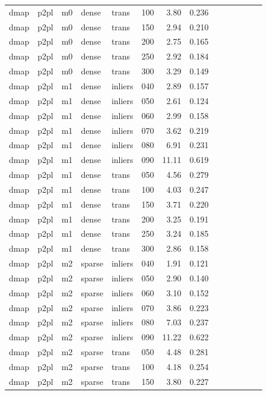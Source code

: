 \begin{table}[htbp]
\begin{tabular}{llllllrrrrrrrr}
  dmap & p2pl & m0 & dense & trans & 100 & 3.80 & 0.236 \\
  dmap & p2pl & m0 & dense & trans & 150 & 2.94 & 0.210 \\
  dmap & p2pl & m0 & dense & trans & 200 & 2.75 & 0.165 \\
  dmap & p2pl & m0 & dense & trans & 250 & 2.92 & 0.184 \\
  dmap & p2pl & m0 & dense & trans & 300 & 3.29 & 0.149 \\
  dmap & p2pl & m1 & dense & inliers & 040 & 2.89 & 0.157 \\
  dmap & p2pl & m1 & dense & inliers & 050 & 2.61 & 0.124 \\
  dmap & p2pl & m1 & dense & inliers & 060 & 2.99 & 0.158 \\
  dmap & p2pl & m1 & dense & inliers & 070 & 3.62 & 0.219 \\
  dmap & p2pl & m1 & dense & inliers & 080 & 6.91 & 0.231 \\
  dmap & p2pl & m1 & dense & inliers & 090 & 11.11 & 0.619 \\
  dmap & p2pl & m1 & dense & trans & 050 & 4.56 & 0.279 \\
  dmap & p2pl & m1 & dense & trans & 100 & 4.03 & 0.247 \\
  dmap & p2pl & m1 & dense & trans & 150 & 3.71 & 0.220 \\
  dmap & p2pl & m1 & dense & trans & 200 & 3.25 & 0.191 \\
  dmap & p2pl & m1 & dense & trans & 250 & 3.24 & 0.185 \\
  dmap & p2pl & m1 & dense & trans & 300 & 2.86 & 0.158 \\
  dmap & p2pl & m2 & sparse & inliers & 040 & 1.91 & 0.121 \\
  dmap & p2pl & m2 & sparse & inliers & 050 & 2.90 & 0.140 \\
  dmap & p2pl & m2 & sparse & inliers & 060 & 3.10 & 0.152 \\
  dmap & p2pl & m2 & sparse & inliers & 070 & 3.86 & 0.223 \\
  dmap & p2pl & m2 & sparse & inliers & 080 & 7.03 & 0.237 \\
  dmap & p2pl & m2 & sparse & inliers & 090 & 11.22 & 0.622 \\
  dmap & p2pl & m2 & sparse & trans & 050 & 4.48 & 0.281 \\
  dmap & p2pl & m2 & sparse & trans & 100 & 4.18 & 0.254 \\
  dmap & p2pl & m2 & sparse & trans & 150 & 3.80 & 0.227 \\

\end{tabular}
\end{table}

